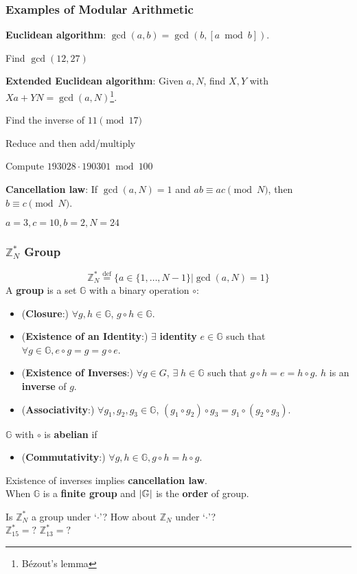 \begin{frame}\frametitle{Examples of Modular Arithmetic}
\textbf{Euclidean algorithm}: $\gcd(a,b) = \gcd(b, [a \bmod b]).$
\begin{exampleblock}{Find $\gcd(12, 27)$}
\end{exampleblock}
\textbf{Extended Euclidean algorithm}: Given $a,N$, find $X,Y$ with $Xa+YN = \gcd(a,N)$\footnote{B\'{e}zout's lemma}.
\begin{exampleblock}{Find the inverse of $11 \pmod {17}$}
\end{exampleblock}
Reduce and then add/multiply
\begin{exampleblock}{Compute $193028 \cdot 190301 \bmod 100$}
\end{exampleblock}
\textbf{Cancellation law}: If $\gcd(a,N)=1$ and $ab \equiv ac \pmod N$, then $b \equiv c \pmod N$.
\begin{exampleblock}{$a=3, c=10, b=2, N=24$}
\end{exampleblock}
\end{frame}
\begin{frame}\frametitle{$\mathbb{Z}_N^*$ Group}
\[ \mathbb{Z}_N^* \overset{\text{def}}{=} \{a \in \{1,\dotsc,N-1 \} | \gcd(a,N) = 1\} \]
A \textbf{group} is a set $\mathbb{G}$ with a binary operation $\circ$:
\begin{itemize}
\item (\textbf{Closure}:) $\forall g,h \in \mathbb{G}$, $g \circ h \in \mathbb{G}$.
\item (\textbf{Existence of an Identity}:) $\exists$ \textbf{identity} $e\in \mathbb{G}$ such that $\forall g\in \mathbb{G}, e \circ g = g = g \circ e$.
\item (\textbf{Existence of Inverses}:) $\forall g \in G$, $\exists\; h \in \mathbb{G}$ such that $g \circ h =e = h \circ g$. $h$ is an \textbf{inverse} of $g$.
\item (\textbf{Associativity}:) $\forall g_1,g_2,g_3 \in \mathbb{G}$, $(g_1\circ g_2)\circ g_3 = g_1 \circ (g_2 \circ g_3)$.
\end{itemize}
$\mathbb{G}$ with $\circ$ is \textbf{abelian} if
\begin{itemize}
\item (\textbf{Commutativity}:) $\forall g,h \in \mathbb{G}, g\circ h = h\circ g$.
\end{itemize}
Existence of inverses implies \textbf{cancellation law}.\\
When $\mathbb{G}$ is a \textbf{finite group} and $\lvert\mathbb{G}\rvert$ is the \textbf{order} of group.
\begin{exampleblock}{
Is $\mathbb{Z}_N^*$ a group under `$\cdot$'? How about $\mathbb{Z}_N$ under `$\cdot$'?\\
$\mathbb{Z}_{15}^* = ?$ $\mathbb{Z}_{13}^* = ?$}
\end{exampleblock}
\end{frame}
